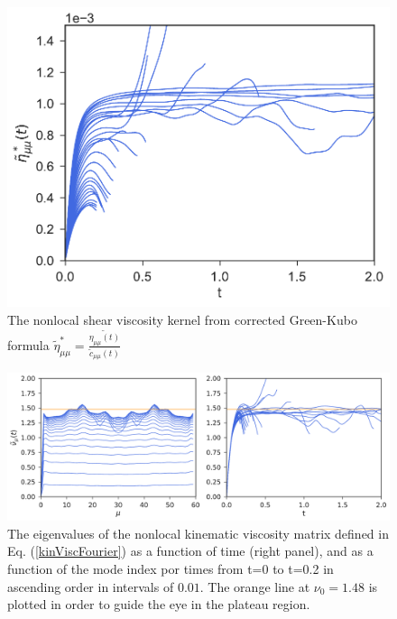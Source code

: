 \documentclass[a4paper,openright,12pt]{book}
\begin{document}
\begin{figure}[h!]
  \centering
\includegraphics[scale=0.45]{EtaStartFourier-PBC}
\caption[The nonlocal shear viscosity kernel for PBC system]{The nonlocal shear viscosity kernel from corrected Green-Kubo formula $\tilde{\eta}^*_{\mu\mu}=\frac{\tilde{\eta_{\mu\mu}(t)}}{\tilde{c}_{\mu\mu}(t)}$}
\label{fig:EtaStartFourier-PBC}
\end{figure}
\begin{figure}[h!]
  \centering
\includegraphics[scale=0.45]{KinVisctFourier-PBC}
\caption[The eigenvalues of the nonlocal kinematic viscosity matrix for PBC system]{The eigenvalues of the nonlocal kinematic viscosity matrix defined in Eq. (\ref{kinViscFourier}) as a function of time (right panel), and as a function of the mode index por times from t=0 to t=0.2 in ascending order in intervals of $0.01$. The orange line at $\nu_0=1.48$ is plotted in order to guide the eye in the plateau region.}
\label{fig:KinVisctFourier-PBC}
\end{figure}

\newpage
\end{document}
